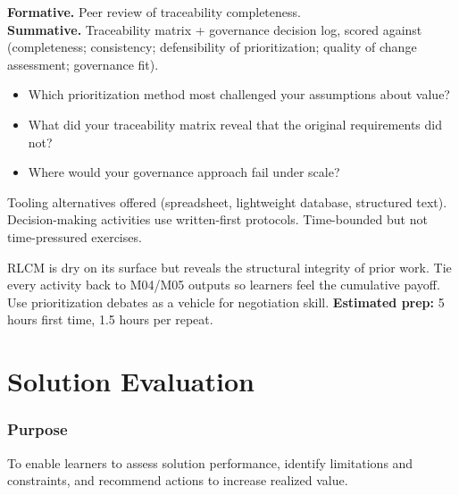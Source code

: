 \documentclass[11pt,letterpaper,oneside]{report}
\begin{document}
\begin{curriculumassessment}
\textbf{Formative.} Peer review of traceability completeness.\\[3pt]
\textbf{Summative.} Traceability matrix + governance decision log, scored against  (completeness; consistency; defensibility of prioritization; quality of change assessment; governance fit).
\end{curriculumassessment}

\begin{curriculumreflection}
\begin{itemize}
  \item Which prioritization method most challenged your assumptions about value?
  \item What did your traceability matrix reveal that the original requirements did not?
  \item Where would your governance approach fail under scale?
\end{itemize}
\end{curriculumreflection}

\begin{curriculumnote}
Tooling alternatives offered (spreadsheet, lightweight database, structured text). Decision-making activities use written-first protocols. Time-bounded but not time-pressured exercises.
\end{curriculumnote}

\begin{curriculumteachingnotes}
RLCM is dry on its surface but reveals the structural integrity of prior work. Tie every activity back to M04/M05 outputs so learners feel the cumulative payoff. Use prioritization debates as a vehicle for negotiation skill. \textbf{Estimated prep:} 5 hours first time, 1.5 hours per repeat.
\end{curriculumteachingnotes}

\chapter{Solution Evaluation}

\subsection*{Purpose}
To enable learners to assess solution performance, identify limitations and constraints, and recommend actions to increase realized value.
\end{document}

